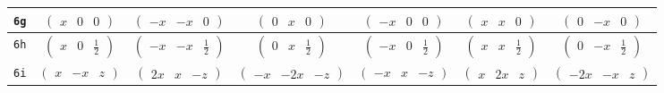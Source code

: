 \documentclass[fleqn,9pt,landscape]{jsarticle}
\begin{document}
\begin{center}
\begin{longtable}{ccccccc}
{\tt 6g} & $ \begin{pmatrix} x & 0 & 0 \end{pmatrix} $ & $ \begin{pmatrix} - x & - x & 0 \end{pmatrix} $ & $ \begin{pmatrix} 0 & x & 0 \end{pmatrix} $ & $ \begin{pmatrix} - x & 0 & 0 \end{pmatrix} $ & $ \begin{pmatrix} x & x & 0 \end{pmatrix} $ & $ \begin{pmatrix} 0 & - x & 0 \end{pmatrix} $ \\ \hline
{\tt 6h} & $ \begin{pmatrix} x & 0 & \frac{1}{2} \end{pmatrix} $ & $ \begin{pmatrix} - x & - x & \frac{1}{2} \end{pmatrix} $ & $ \begin{pmatrix} 0 & x & \frac{1}{2} \end{pmatrix} $ & $ \begin{pmatrix} - x & 0 & \frac{1}{2} \end{pmatrix} $ & $ \begin{pmatrix} x & x & \frac{1}{2} \end{pmatrix} $ & $ \begin{pmatrix} 0 & - x & \frac{1}{2} \end{pmatrix} $ \\ \hline
{\tt 6i} & $ \begin{pmatrix} x & - x & z \end{pmatrix} $ & $ \begin{pmatrix} 2 x & x & - z \end{pmatrix} $ & $ \begin{pmatrix} - x & - 2 x & - z \end{pmatrix} $ & $ \begin{pmatrix} - x & x & - z \end{pmatrix} $ & $ \begin{pmatrix} x & 2 x & z \end{pmatrix} $ & $ \begin{pmatrix} - 2 x & - x & z \end{pmatrix} $ \\ \hline

\end{longtable}
\end{center}
\end{document}
